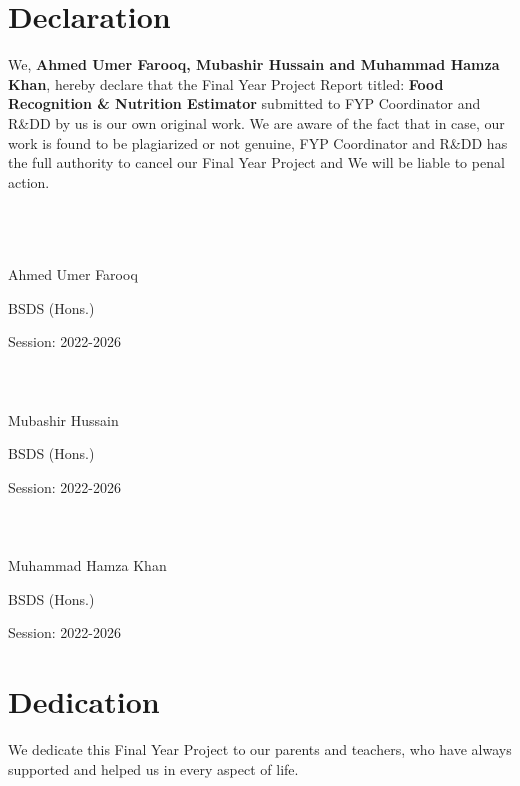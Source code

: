 \documentclass[12pt, openany]{report}
\begin{document}
\chapter*{\centering Declaration}
We, \textbf {Ahmed Umer Farooq, Mubashir Hussain and Muhammad Hamza Khan}, hereby declare that the Final Year Project Report titled: \textbf {Food Recognition \& Nutrition Estimator} submitted to FYP Coordinator and R\&DD by us is our own original work. We are aware of the fact that in case, our work is found to be plagiarized or not genuine, FYP Coordinator and R\&DD has the full authority to cancel our Final Year Project and We will be liable to penal action.
\\~\\~\\~\\
\begin{flushright}
Ahmed Umer Farooq

BSDS (Hons.)

Session: 2022-2026
\\~\\~\\~\\
Mubashir Hussain

BSDS (Hons.)

Session: 2022-2026
\\~\\~\\~\\
Muhammad Hamza Khan

BSDS (Hons.)

Session: 2022-2026
\end{flushright} 


\chapter*{\centering Dedication}
\begin{center}
We dedicate this Final Year Project to our parents and teachers, who have always supported and helped us in every aspect of life.
\end{center}        


\end{document}
